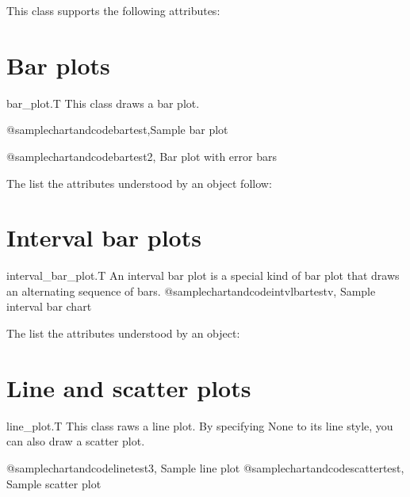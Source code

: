 \documentclass{howto}
\begin{document}
This class supports the following attributes:


\section{Bar plots}

\begin{classdesc*}{bar_plot.T}
  This class draws a bar plot.

@samplechartandcode{bartest,Sample bar plot}

@samplechartandcode{bartest2, Bar plot with error bars}
\end{classdesc*}

The list the attributes understood by an  object follow:


\section{Interval bar plots}

\begin{classdesc*}{interval_bar_plot.T}
An interval bar plot is a special kind of bar plot that draws
an alternating sequence of bars.
@samplechartandcode{intvlbartestv, Sample interval bar chart}
\end{classdesc*}

The list the attributes understood by an  object:


\section{Line and scatter plots}

\begin{classdesc*}{line_plot.T}
  This class raws a line plot. By specifying None to its line style,
  you can also draw a scatter plot.

@samplechartandcode{linetest3, Sample line plot}
@samplechartandcode{scattertest, Sample scatter plot}

\end{classdesc*}

\end{document}
